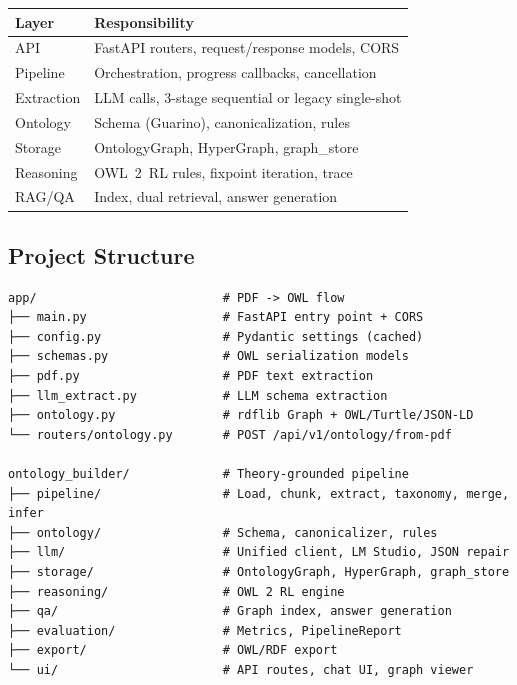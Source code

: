 \documentclass[11pt,a4paper]{article}
\begin{document}
\begin{center}
\begin{tabular}{@{}ll@{}}
\toprule
\textbf{Layer} & \textbf{Responsibility} \\
\midrule
API & FastAPI routers, request/response models, CORS \\
Pipeline & Orchestration, progress callbacks, cancellation \\
Extraction & LLM calls, 3-stage sequential or legacy single-shot \\
Ontology & Schema (Guarino), canonicalization, rules \\
Storage & OntologyGraph, HyperGraph, graph\_store \\
Reasoning & OWL~2~RL rules, fixpoint iteration, trace \\
RAG/QA & Index, dual retrieval, answer generation \\
\bottomrule
\end{tabular}
\end{center}

\subsection{Project Structure}

\begin{verbatim}
app/                          # PDF -> OWL flow
├── main.py                   # FastAPI entry point + CORS
├── config.py                 # Pydantic settings (cached)
├── schemas.py                # OWL serialization models
├── pdf.py                    # PDF text extraction
├── llm_extract.py            # LLM schema extraction
├── ontology.py               # rdflib Graph + OWL/Turtle/JSON-LD
└── routers/ontology.py       # POST /api/v1/ontology/from-pdf

ontology_builder/             # Theory-grounded pipeline
├── pipeline/                 # Load, chunk, extract, taxonomy, merge, infer
├── ontology/                 # Schema, canonicalizer, rules
├── llm/                      # Unified client, LM Studio, JSON repair
├── storage/                  # OntologyGraph, HyperGraph, graph_store
├── reasoning/                # OWL 2 RL engine
├── qa/                       # Graph index, answer generation
├── evaluation/               # Metrics, PipelineReport
├── export/                   # OWL/RDF export
└── ui/                       # API routes, chat UI, graph viewer
\end{verbatim}

\end{document}
